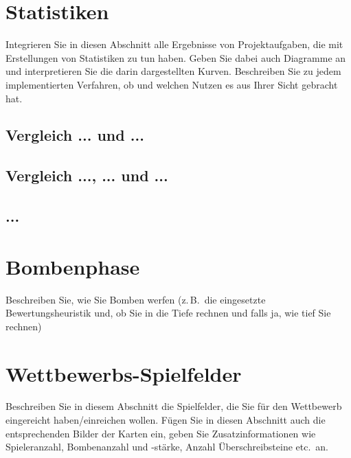 \documentclass[12pt,a4paper,bibliography=totocnumbered,listof=totocnumbered]{scrartcl}
\begin{document}
\newpage
\section{Statistiken}
Integrieren Sie in diesen Abschnitt alle Ergebnisse von Projektaufgaben, die mit Erstellungen von Statistiken zu tun haben. Geben Sie dabei auch Diagramme an und interpretieren Sie die darin dargestellten Kurven. Beschreiben Sie zu jedem implementierten Verfahren, ob und welchen Nutzen es aus Ihrer Sicht gebracht hat.

\subsection{Vergleich ... und ...}

\subsection{Vergleich ..., ... und ...}

\subsection{...}


\newpage
\section{Bombenphase}
Beschreiben Sie, wie Sie Bomben werfen (z.\,B.\ die eingesetzte Bewertungsheuristik und, ob Sie in die Tiefe rechnen und falls ja, wie tief Sie rechnen)


\newpage
\section{Wettbewerbs-Spielfelder}
Beschreiben Sie in diesem Abschnitt die Spielfelder, die Sie für den Wettbewerb eingereicht haben/einreichen wollen. Fügen Sie in diesen Abschnitt auch die entsprechenden Bilder der Karten ein, geben Sie Zusatzinformationen wie Spieleranzahl, Bombenanzahl und -stärke, Anzahl Überschreibsteine etc.\ an.
\end{document}
